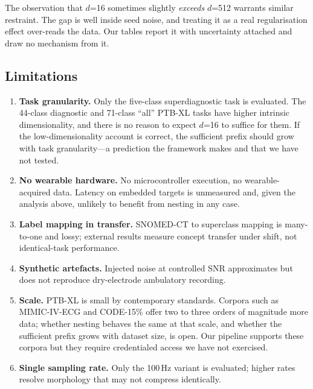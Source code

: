The observation that $d$=16 sometimes slightly \emph{exceeds} $d$=512 warrants
similar restraint. The gap is well inside seed noise, and treating it as a
real regularisation effect over-reads the data. Our tables report it with
uncertainty attached and draw no mechanism from it.

\subsection{Limitations}

\begin{enumerate}
\item \textbf{Task granularity.} Only the five-class superdiagnostic task is
evaluated. The 44-class diagnostic and 71-class ``all'' PTB-XL tasks have
higher intrinsic dimensionality, and there is no reason to expect $d$=16 to
suffice for them. If the low-dimensionality account is correct, the
sufficient prefix should grow with task granularity---a prediction the
framework makes and that we have not tested.

\item \textbf{No wearable hardware.} No microcontroller execution, no
wearable-acquired data. Latency on embedded targets is unmeasured and, given
the analysis above, unlikely to benefit from nesting in any case.

\item \textbf{Label mapping in transfer.} SNOMED-CT to superclass mapping is
many-to-one and lossy; external results measure concept transfer under shift,
not identical-task performance.

\item \textbf{Synthetic artefacts.} Injected noise at controlled SNR
approximates but does not reproduce dry-electrode ambulatory recording.

\item \textbf{Scale.} PTB-XL is small by contemporary standards. Corpora such
as MIMIC-IV-ECG and CODE-15\% offer two to three orders of magnitude more
data; whether nesting behaves the same at that scale, and whether the
sufficient prefix grows with dataset size, is open. Our pipeline supports
these corpora but they require credentialed access we have not exercised.

\item \textbf{Single sampling rate.} Only the 100\,Hz variant is evaluated;
higher rates resolve morphology that may not compress identically.
\end{enumerate}


